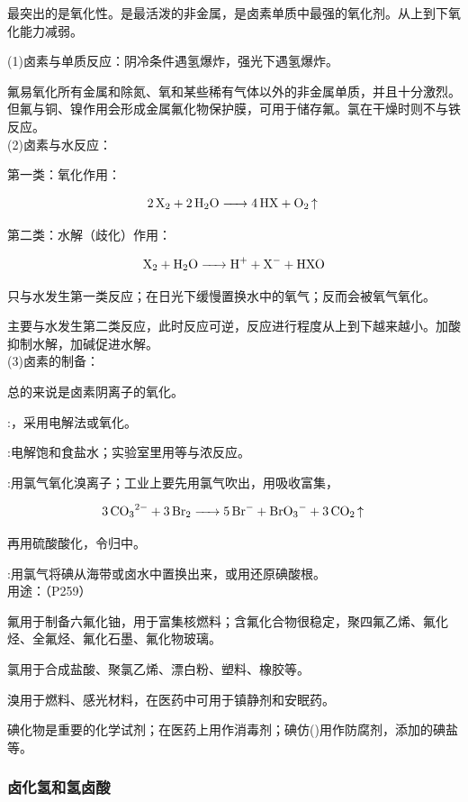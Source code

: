 \documentclass[a4paper,UTF8]{article}
\begin{document}
最突出的是氧化性。是最活泼的非金属，是卤素单质中最强的氧化剂。从上到下氧化能力减弱。

(1)卤素与单质反应：阴冷条件遇氢爆炸，强光下遇氢爆炸。

氟易氧化所有金属和除氮、氧和某些稀有气体以外的非金属单质，并且十分激烈。但氟与铜、镍作用会形成金属氟化物保护膜，可用于储存氟。氯在干燥时则不与铁反应。\\

(2)卤素与水反应：

第一类：氧化作用：

$$ \ce{2X2 + 2H2O -> 4HX + O2\ce{^}} $$

第二类：水解（歧化）作用：

$$ \ce{X2 + H2O -> H+ + X- + HXO} $$

只与水发生第一类反应；在日光下缓慢置换水中的氧气；反而会被氧气氧化。

主要与水发生第二类反应，此时反应可逆，反应进行程度从上到下越来越小。加酸抑制水解，加碱促进水解。\\

(3)卤素的制备：

总的来说是卤素阴离子的氧化。

:，采用电解法或氧化。

:电解饱和食盐水；实验室里用等与浓反应。

:用氯气氧化溴离子；工业上要先用氯气吹出，用吸收富集，

$$ \ce{3CO3^2- + 3Br2 -> 5Br- + BrO3- + 3CO2\ce{^}} $$

再用硫酸酸化，令归中。

:用氯气将碘从海带或卤水中置换出来，或用还原碘酸根。\\

用途：（P259）

氟用于制备六氟化铀，用于富集核燃料；含氟化合物很稳定，聚四氟乙烯、氟化烃、全氟烃、氟化石墨、氟化物玻璃。

氯用于合成盐酸、聚氯乙烯、漂白粉、塑料、橡胶等。

溴用于燃料、感光材料，在医药中可用于镇静剂和安眠药。

碘化物是重要的化学试剂；在医药上用作消毒剂；碘仿()用作防腐剂，添加的碘盐等。

\subsubsection{卤化氢和氢卤酸}
\end{document}
